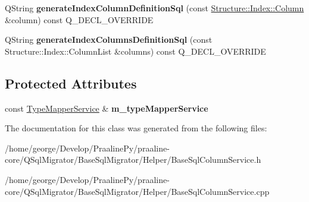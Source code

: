 \begin{DoxyCompactItemize}
Q\+String {\bfseries generate\+Index\+Column\+Definition\+Sql} (const \hyperlink{class_q_sql_migrator_1_1_structure_1_1_index_1_1_column}{Structure\+::\+Index\+::\+Column} \&column) const Q\+\_\+\+D\+E\+C\+L\+\_\+\+O\+V\+E\+R\+R\+I\+DE
\item 
\mbox{\label{class_q_sql_migrator_1_1_helper_1_1_base_sql_column_service_a650745d0a11d04226c11103bcbcba2ce}} 
Q\+String {\bfseries generate\+Index\+Columns\+Definition\+Sql} (const Structure\+::\+Index\+::\+Column\+List \&columns) const Q\+\_\+\+D\+E\+C\+L\+\_\+\+O\+V\+E\+R\+R\+I\+DE
\end{DoxyCompactItemize}
\subsection*{Protected Attributes}
\begin{DoxyCompactItemize}
\item 
\mbox{\label{class_q_sql_migrator_1_1_helper_1_1_base_sql_column_service_a4181f6442b4a6109fb7ab4c651df5343}} 
const \hyperlink{class_q_sql_migrator_1_1_helper_1_1_type_mapper_service}{Type\+Mapper\+Service} \& {\bfseries m\+\_\+type\+Mapper\+Service}
\end{DoxyCompactItemize}


The documentation for this class was generated from the following files\+:\begin{DoxyCompactItemize}
\item 
/home/george/\+Develop/\+Praaline\+Py/praaline-\/core/\+Q\+Sql\+Migrator/\+Base\+Sql\+Migrator/\+Helper/Base\+Sql\+Column\+Service.\+h\item 
/home/george/\+Develop/\+Praaline\+Py/praaline-\/core/\+Q\+Sql\+Migrator/\+Base\+Sql\+Migrator/\+Helper/Base\+Sql\+Column\+Service.\+cpp\end{DoxyCompactItemize}

